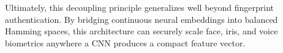 \documentclass[11pt,a4paper]{article}
\begin{document}
Ultimately, this decoupling principle generalizes well beyond fingerprint authentication. By bridging continuous neural embeddings into balanced Hamming spaces, this architecture can securely scale face, iris, and voice biometrics anywhere a CNN produces a compact feature vector.




\appendix

\end{document}
